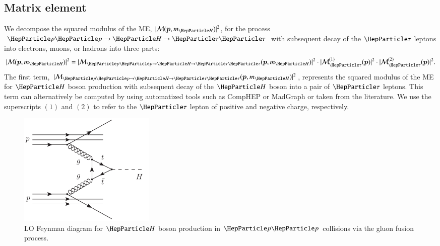 \subsection{Matrix element}
\label{sec:mem_ME}

We decompose the squared modulus of the ME, $\vert \mathcal{M}(\bm{p},m_{\PHiggs}) \vert^{2}$, for the process $\Pp\Pp \to \PHiggs \to \Pgt\Pgt$
with subsequent decay of the $\Pgt$ leptons into electrons, muons, or
hadrons into three parts:
\begin{equation}
\vert \mathcal{M}(\bm{p},m_{\PHiggs}) \vert^{2} = 
 \vert \mathcal{M}_{\Pp\Pp \to \PHiggs \to \Pgt\Pgt}(\bm{p},m_{\PHiggs}) \vert^{2} 
\cdot \vert \mathcal{M}^{(1)}_{\Pgt}(\bm{p}) \vert^{2} 
\cdot \vert \mathcal{M}^{(2)}_{\Pgt}(\bm{p}) \vert^{2} .
 \label{eq:meFactorization}
\end{equation}
The first term, $\vert \mathcal{M}_{\Pp\Pp \to \PHiggs \to
  \Pgt\Pgt}(\bm{p},m_{\PHiggs}) \vert^{2}$, represents the squared
modulus of the ME for $\PHiggs$ boson production with subsequent decay of the $\PHiggs$ boson into a pair of $\Pgt$ leptons.
This term can alternatively be computed by using automatized tools such as CompHEP or MadGraph or taken from the literature.
We use the superscripts $(1)$ and $(2)$ to refer to the $\Pgt$ lepton of positive and negative charge, respectively.

\begin{figure}
\begin{center}
\includegraphics*[height=54mm]{figures/ggH_FeynmanDiagram.pdf}
\end{center}
\caption{
  LO Feynman diagram for $\PHiggs$ boson production in $\Pp\Pp$ collisions via the gluon fusion process.
}
\label{fig:ggH_FeynmanDiagram}
\end{figure}

